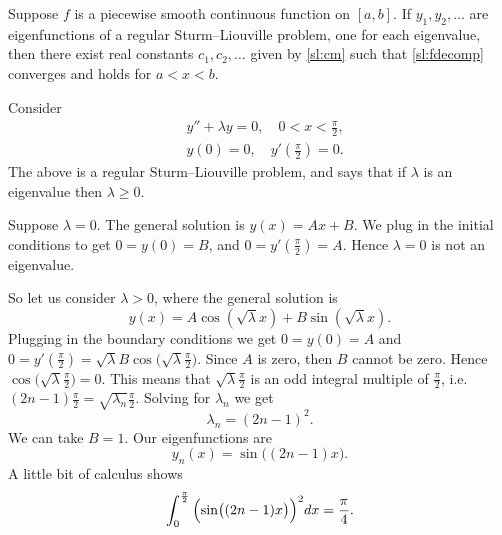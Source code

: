 \documentclass{ximera}
\begin{document}
\begin{theorem}
    Suppose $f$ is a piecewise smooth continuous function on $[a,b]$.  If $y_1, y_2, \ldots$ are eigenfunctions of a regular Sturm--Liouville problem, one for each eigenvalue, then there exist real constants $c_1, c_2, \ldots$ given by \eqref{sl:cm} such that \eqref{sl:fdecomp} converges and holds for $a < x < b$.
\end{theorem}

\begin{example}
    Consider
    \begin{align*}
        & y'' + \lambda y = 0, \quad 0 < x < \frac{\pi}{2} , \\
        & y(0) =0, \quad y'(\frac{\pi}{2}) = 0 .
    \end{align*}
    The above is a regular Sturm--Liouville problem, and  says that if $\lambda$ is an eigenvalue then $\lambda \geq 0$.
    
    Suppose $\lambda = 0$.  The general solution is $y(x) = Ax + B$. We plug in the initial conditions to get $0=y(0) = B$, and $0 = y'(\frac{\pi}{2}) = A$. Hence $\lambda = 0$ is not an eigenvalue.
    
    So let us consider $\lambda > 0$, where the general solution is
    \begin{equation*}
        y(x) = A \cos ( \sqrt{\lambda}  x ) + B \sin ( \sqrt{\lambda}  x) .
    \end{equation*}
    Plugging in the boundary conditions we get $0 = y(0) = A$ and 
    $0 = y'(\frac{\pi}{2}) = \sqrt{\lambda}  B \cos \bigl(\sqrt{\lambda}  \frac{\pi}{2}\bigr)$. 
    Since $A$ is zero, then $B$ cannot be zero.  Hence $\cos \bigl( \sqrt{\lambda}  \frac{\pi}{2}\bigr) = 0$. This means that $\sqrt{\lambda} \frac{\pi}{2}$ is an odd integral multiple of 
    $\frac{\pi}{2}$, i.e.\ $(2n-1)\frac{\pi}{2} = \sqrt{\lambda_n} \frac{\pi}{2}$. 
    Solving for $\lambda_n$ we get
    \begin{equation*}
        \lambda_n = {(2n-1)}^2 .
    \end{equation*}
    We can take $B = 1$.  Our eigenfunctions are
    \begin{equation*}
        y_n(x) = \sin \bigl( (2n-1)x \bigr) .
    \end{equation*}
    A little bit of calculus shows
    \begin{equation*}
        \int_0^{\frac{\pi}{2}} {\Bigl( \sin \bigl( (2n-1)x \bigr) \Bigr)}^2  dx = \frac{\pi}{4} .
    \end{equation*}
    

\end{example}
\end{document}
